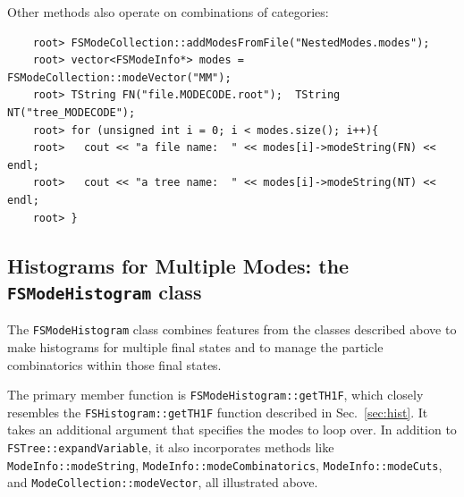 \documentclass[11pt]{article}
\begin{document}
Other methods also operate on combinations of categories:
\begin{verbatim}
    root> FSModeCollection::addModesFromFile("NestedModes.modes");
    root> vector<FSModeInfo*> modes = FSModeCollection::modeVector("MM");
    root> TString FN("file.MODECODE.root");  TString NT("tree_MODECODE");
    root> for (unsigned int i = 0; i < modes.size(); i++){ 
    root>   cout << "a file name:  " << modes[i]->modeString(FN) << endl;
    root>   cout << "a tree name:  " << modes[i]->modeString(NT) << endl;
    root> }
\end{verbatim}


\subsection{Histograms for Multiple Modes: the {\tt FSModeHistogram} class}
\label{sec:modehist}

The {\tt FSModeHistogram} class combines features from the classes described above to make histograms for multiple final states and to manage the particle combinatorics within those final states.

The primary member function is {\tt FSModeHistogram::getTH1F}, which closely resembles the {\tt FSHistogram::getTH1F} function described in Sec.~\ref{sec:hist}.  It takes an additional argument that specifies the modes to loop over.  In addition to {\tt FSTree::expandVariable}, it also incorporates methods like {\tt ModeInfo::modeString}, {\tt ModeInfo::modeCombinatorics}, {\tt ModeInfo::modeCuts}, and {\tt ModeCollection::modeVector}, all illustrated above. 
\end{document}
